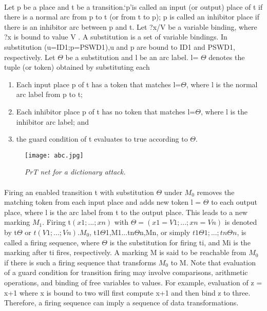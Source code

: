 \paragraph{}
Let p be a place and t be a transition.\lq p\rq is called an input (or output) place of t if there is a normal arc from p to t (or from t to p); p is called an inhibitor place if there is an inhibitor arc between p and t. Let ?x/V be a variable
binding, where ?x is bound to value V . A substitution is a
set of variable bindings. In substitution (u=ID1;p=PSWD1),u and p are bound to ID1 and PSWD1,
respectively. Let $\Theta$ be a substitution and l be an arc label. l= $\Theta$
denotes the tuple (or token) obtained by substituting each
\begin{enumerate}
\item Each input place p of t has a token that
matches l=$\Theta$, where l is the normal arc label from p to t;
\item Each inhibitor place p of t has no token that matches l=$\Theta$,
where l is the inhibitor arc label; and
\item the guard condition of t evaluates to true according to $\Theta$.
\end{enumerate}
\begin{figure}
\centering
\texttt{[image: abc.jpg]}
\caption{\emph{PrT net for a dictionary attack.}}
\label{fig:1}
\end{figure}
\paragraph{}Firing an enabled transition t with substitution $\Theta$ under $M_0$  removes the matching token from each input place and adds new token l = $\Theta$ to each output place, where l is the arc label from t to the output place. This leads to a new marking $M_1$. Firing t$(x1; . . . ; xn)$ with $\Theta=(x1=V1; . . . ;xn=Vn )$ is denoted by t$\Theta$ or $t(V1; . . . ; Vn)$.$M_0$, t1$\Theta$1,M1...tn$\Theta$n,Mn, or simply $t1 \Theta 1; . . . ; tn\Theta n$, is called a firing sequence, where $\Theta$ is the substitution for firing ti, and Mi is the marking after ti fires, respectively. A marking M is said to be reachable from $M_0$ if there is such a firing sequence that transforms $M_0$ to M. Note that evaluation of a guard condition for transition firing may involve comparisons, arithmetic operations, and binding of free variables to values. For example, evaluation of z = x+1 where x is bound to two will first compute
x+1 and then bind z to three. Therefore, a firing sequence
can imply a sequence of data transformations.
